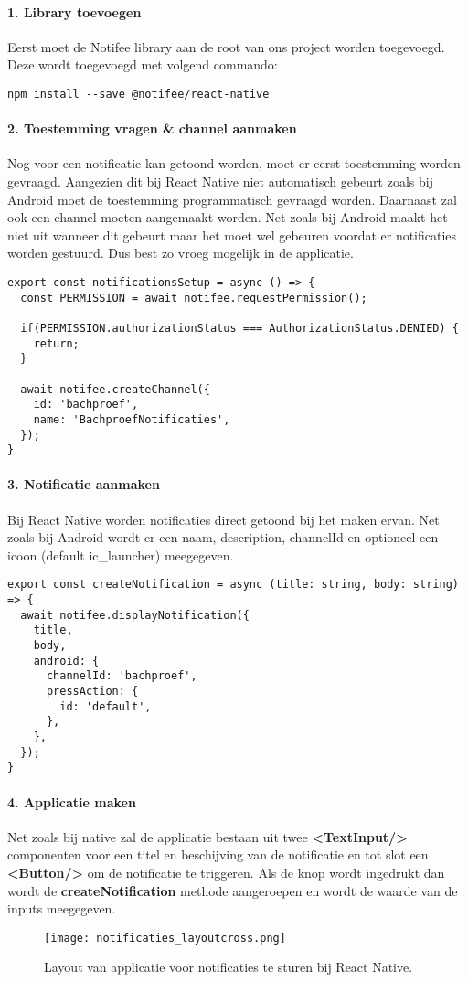 \paragraph{1. Library toevoegen}
Eerst moet de Notifee library aan de root van ons project worden toegevoegd. 
Deze wordt toegevoegd met volgend commando:
\begin{verbatim}
npm install --save @notifee/react-native
\end{verbatim}

\paragraph{2. Toestemming vragen \& channel aanmaken}
Nog voor een notificatie kan getoond worden, moet er eerst toestemming worden gevraagd. 
Aangezien dit bij React Native niet automatisch gebeurt zoals bij Android moet de 
toestemming programmatisch gevraagd worden. Daarnaast zal ook een channel moeten aangemaakt worden.
Net zoals bij Android maakt het niet uit wanneer dit gebeurt maar het moet wel gebeuren 
voordat er notificaties worden gestuurd. Dus best zo vroeg mogelijk in de applicatie.
\begin{verbatim}
export const notificationsSetup = async () => {
  const PERMISSION = await notifee.requestPermission();

  if(PERMISSION.authorizationStatus === AuthorizationStatus.DENIED) {
    return;
  }

  await notifee.createChannel({
    id: 'bachproef',
    name: 'BachproefNotificaties',
  });
}

\end{verbatim}

\paragraph{3. Notificatie aanmaken}
Bij React Native worden notificaties direct getoond bij het maken ervan. Net zoals bij Android 
wordt er een naam, description, channelId en optioneel een icoon (default ic\_launcher) meegegeven. 
\begin{verbatim}
export const createNotification = async (title: string, body: string) => {
  await notifee.displayNotification({
    title,
    body,
    android: {
      channelId: 'bachproef',
      pressAction: {
        id: 'default',
      },
    },
  });
}
\end{verbatim}

\paragraph{4. Applicatie maken}
Net zoals bij native zal de applicatie bestaan 
uit twee \textbf{<TextInput/>} componenten voor een titel en beschijving van de notificatie en tot slot een 
\textbf{<Button/>} om de notificatie te triggeren. Als de knop wordt ingedrukt dan wordt de 
\textbf{createNotification} methode aangeroepen en wordt de waarde van de inputs meegegeven.
\begin{figure}[H]
  \centering
  \texttt{[image: notificaties\_layoutcross.png]}
  \caption{Layout van applicatie voor notificaties te sturen bij React Native.}
\end{figure}